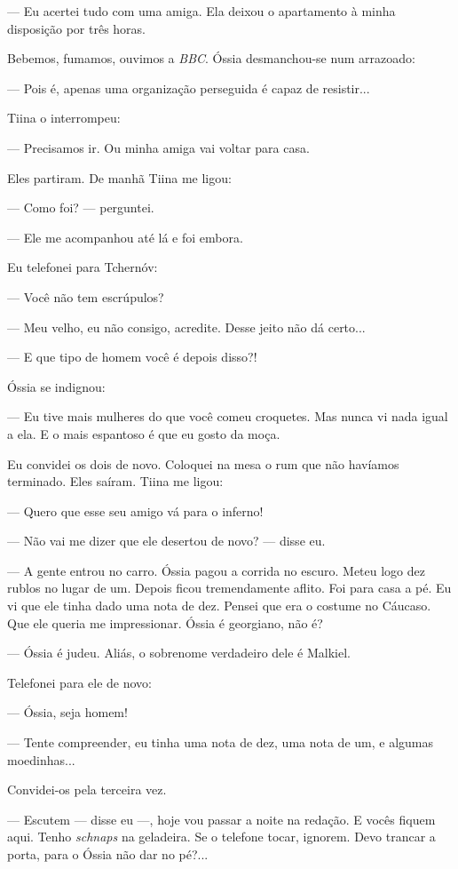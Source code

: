 --- Eu acertei tudo com uma amiga. Ela deixou o apartamento à minha
disposição por três horas.

Bebemos, fumamos, ouvimos a \emph{BBC}. Óssia desmanchou-se num
arrazoado:

--- Pois é, apenas uma organização perseguida é capaz de resistir...

Tiina o interrompeu:

--- Precisamos ir. Ou minha amiga vai voltar para casa.

Eles partiram. De manhã Tiina me ligou:

--- Como foi? --- perguntei.

--- Ele me acompanhou até lá e foi embora.

Eu telefonei para Tchernóv:

--- Você não tem escrúpulos?

--- Meu velho, eu não consigo, acredite. Desse jeito não dá certo...

--- E que tipo de homem você é depois disso?!

Óssia se indignou:

--- Eu tive mais mulheres do que você comeu croquetes. Mas nunca vi nada
igual a ela. E o mais espantoso é que eu gosto da moça.

Eu convidei os dois de novo. Coloquei na mesa o rum que não havíamos
terminado. Eles saíram. Tiina me ligou:

--- Quero que esse seu amigo vá para o inferno!

--- Não vai me dizer que ele desertou de novo? --- disse eu.

--- A gente entrou no carro. Óssia pagou a corrida no escuro. Meteu logo
dez rublos no lugar de um. Depois ficou tremendamente aflito. Foi para
casa a pé. Eu vi que ele tinha dado uma nota de dez. Pensei que era o
costume no Cáucaso. Que ele queria me impressionar. Óssia é georgiano,
não é?

--- Óssia é judeu. Aliás, o sobrenome verdadeiro dele é Malkiel.

Telefonei para ele de novo:

--- Óssia, seja homem!

--- Tente compreender, eu tinha uma nota de dez, uma nota de um, e
algumas moedinhas...

Convidei-os pela terceira vez.

--- Escutem --- disse eu ---, hoje vou passar a noite na redação. E
vocês fiquem aqui. Tenho \emph{schnaps} na geladeira. Se o telefone
tocar, ignorem. Devo trancar a porta, para o Óssia não dar no pé?...

